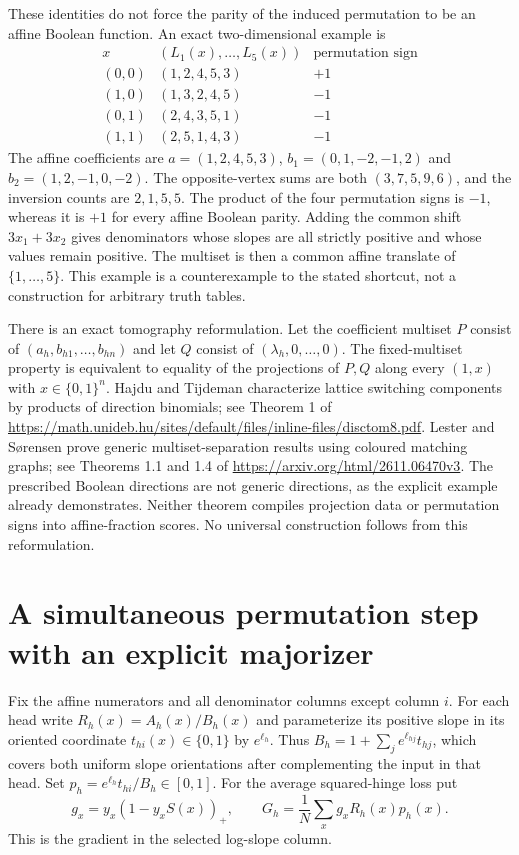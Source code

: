 \documentclass[11pt]{article}
\begin{document}
These identities do not force the parity of the induced permutation
to be an affine Boolean function. An exact two-dimensional example is
\[
 \begin{array}{c|c|c}
 x& (L_1(x),\ldots,L_5(x))&\text{permutation sign}\\ \hline
 (0,0)&(1,2,4,5,3)&+1\\
 (1,0)&(1,3,2,4,5)&-1\\
 (0,1)&(2,4,3,5,1)&-1\\
 (1,1)&(2,5,1,4,3)&-1
 \end{array}
\]
The affine coefficients are
$a=(1,2,4,5,3)$,
$b_1=(0,1,-2,-1,2)$ and $b_2=(1,2,-1,0,-2)$.
The opposite-vertex sums are both $(3,7,5,9,6)$, and the
inversion counts are $2,1,5,5$. The product of the four permutation
signs is $-1$, whereas it is $+1$ for every affine Boolean parity.
Adding the common shift $3x_1+3x_2$ gives denominators whose slopes
are all strictly positive and whose values remain positive. The
multiset is then a common affine translate of $\{1,\ldots,5\}$.
This example is a counterexample to the stated shortcut, not a
construction for arbitrary truth tables.

There is an exact tomography reformulation. Let the coefficient
multiset $P$ consist of $(a_h,b_{h1},\ldots,b_{hn})$ and let $Q$
consist of $(\lambda_h,0,\ldots,0)$. The fixed-multiset property
is equivalent to equality of the projections of $P,Q$ along every
$(1,x)$ with $x\in\{0,1\}^n$.
Hajdu and Tijdeman characterize lattice switching components by
products of direction binomials; see Theorem 1 of
\url{https://math.unideb.hu/sites/default/files/inline-files/disctom8.pdf}.
Lester and S\o rensen prove generic multiset-separation results using
coloured matching graphs; see Theorems 1.1 and 1.4 of
\url{https://arxiv.org/html/2611.06470v3}.
The prescribed Boolean directions are not generic directions, as the
explicit example already demonstrates. Neither theorem compiles
projection data or permutation signs into affine-fraction scores.
No universal construction follows from this reformulation.


\section{A simultaneous permutation step with an explicit majorizer}

Fix the affine numerators and all denominator columns except column $i$.
For each head write $R_h(x)=A_h(x)/B_h(x)$ and parameterize its
positive slope in its oriented coordinate $t_{hi}(x)\in\{0,1\}$ by
$e^{\ell_h}$. Thus $B_h=1+\sum_j e^{\ell_{hj}}t_{hj}$, which covers
both uniform slope orientations after complementing the input in that
head. Set $p_h=e^{\ell_h}t_{hi}/B_h\in[0,1]$.
For the average squared-hinge loss put
\[
 g_x=y_x(1-y_xS(x))_+,\qquad
 G_h=\frac1N\sum_x g_xR_h(x)p_h(x).
\]
This is the gradient in the selected log-slope column.
\end{document}
